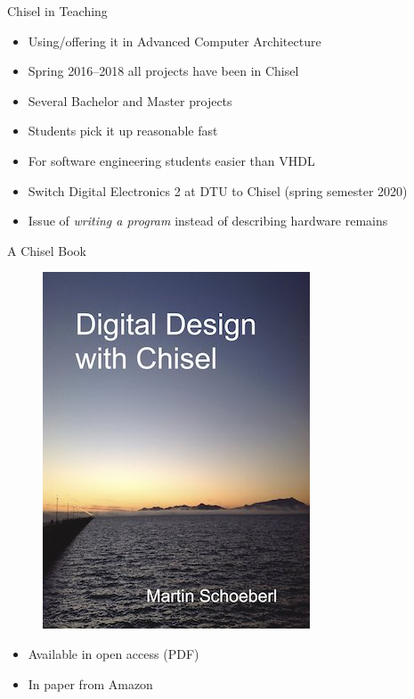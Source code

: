 \documentclass[xcolor=pdflatex,dvipsnames,table]{beamer}
\begin{document}
\begin{frame}[fragile]{Chisel in Teaching}
\begin{itemize}
\item Using/offering it in Advanced Computer Architecture
\item Spring 2016--2018 all projects have been in Chisel
\item Several Bachelor and Master projects
\item Students pick it up reasonable fast
\item For software engineering students easier than VHDL
\item Switch Digital Electronics 2 at DTU to Chisel (spring semester 2020)
\item Issue of \emph{writing a program} instead of describing hardware remains
\end{itemize}
\end{frame}


\begin{frame}[fragile]{A Chisel Book}
\begin{figure}
    \centering
    \includegraphics[scale=0.4]{../cover-small}
\end{figure}

\begin{itemize}
\item Available in open access (PDF)
\item In paper from Amazon
\end{itemize}
\end{frame}
\end{document}
